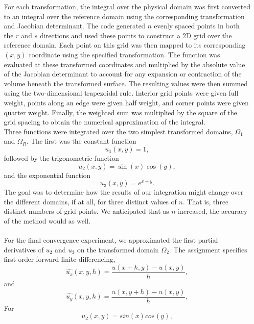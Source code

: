 \documentclass[12pt]{article}
\begin{document}
For each transformation, the integral over the physical domain was first converted to an integral over the reference domain using the corresponding transformation and Jacobian determinant. The code generated $n$ evenly spaced points in both the $r$ and $s$ directions and used these points to construct a 2D grid over the reference domain. Each point on this grid was then mapped to its corresponding $(x,y)$ coordinate using the specified transformation. The function was evaluated at these transformed coordinates and multiplied by the absolute value of the Jacobian determinant to account for any expansion or contraction of the volume beneath the transformed surface. The resulting values were then summed using the two-dimensional trapezoidal rule. Interior grid points were given full weight, points along an edge were given half weight, and corner points were given quarter weight. Finally, the weighted sum was multiplied by the square of the grid spacing to obtain the numerical approximation of the integral.
\\
Three functions were integrated over the two simplest transformed domains, $\Omega_1$ and $\Omega_R$. The first was the constant function
\begin{equation}
    u_1(x,y)=1,
\end{equation}
followed by the trigonometric function
\begin{equation}
    u_2(x,y)=\sin(x)\cos(y),
\end{equation}
and the exponential function
\begin{equation}
    u_3(x,y)=e^{x+y}.
\end{equation}
The goal was to determine how the results of our integration might change over the different domains, if at all, for three distinct values of $n$. That is, three distinct numbers of grid points. We anticipated that as $n$ increased, the accuracy of the method would as well. \\\\
For the final convergence experiment, we approximated the first partial derivatives of $u_2$ and $u_3$ on the transformed domain $\Omega_2$. The assignment specifies first-order forward finite differencing, \begin{equation}
    \hat{u_x}(x,y,h) = \frac{u(x+h,y) - u(x,y)}{h},
\end{equation}
and \begin{equation}
    \hat{u_y}(x,y,h) = \frac{u(x, y+h) - u(x,y)}{h},
\end{equation}
For \begin{equation}
    u_2(x,y) = sin(x) cos(y),
\end{equation}
\end{document}
